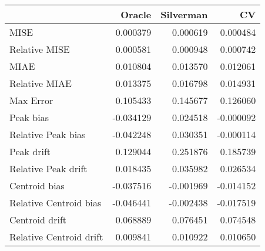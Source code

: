 \begin{tabular}{lrrr}
  \hline
 & Oracle & Silverman & CV \\ 
  \hline
MISE & 0.000379 & 0.000619 & 0.000484 \\ 
  Relative MISE & 0.000581 & 0.000948 & 0.000742 \\ 
  MIAE & 0.010804 & 0.013570 & 0.012061 \\ 
  Relative MIAE & 0.013375 & 0.016798 & 0.014931 \\ 
  Max Error & 0.105433 & 0.145677 & 0.126060 \\ 
  Peak bias & -0.034129 & 0.024518 & -0.000092 \\ 
  Relative Peak bias & -0.042248 & 0.030351 & -0.000114 \\ 
  Peak drift & 0.129044 & 0.251876 & 0.185739 \\ 
  Relative Peak drift & 0.018435 & 0.035982 & 0.026534 \\ 
  Centroid bias & -0.037516 & -0.001969 & -0.014152 \\ 
  Relative Centroid bias & -0.046441 & -0.002438 & -0.017519 \\ 
  Centroid drift & 0.068889 & 0.076451 & 0.074548 \\ 
  Relative Centroid drift & 0.009841 & 0.010922 & 0.010650 \\ 
   \hline
\end{tabular}

